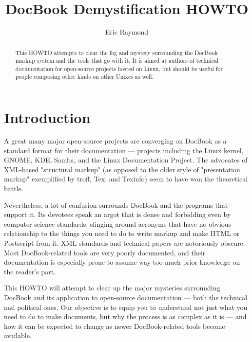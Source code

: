 \documentclass[pdftex,english,a4paper,10pt]{infocom}
\title{DocBook Demystification HOWTO}
\author{Eric Raymond}
\begin{document}
\maketitle

\begin{abstract}


  This HOWTO attempts to clear the fog and mystery surrounding the
  DocBook markup system and the tools that go with it.  It is aimed at
  authors of technical documentation for open-source projects hosted
  on Linux, but should be useful for people composing other kinds on
  other Unixes as well.  
  
\end{abstract}


\section{Introduction}
\label{intro}\hypertarget{intro}{}%

A great many major open-source projects are converging on
DocBook as a standard format for their documentation --- projects
including the Linux kernel, GNOME, KDE, Samba, and the Linux
Documentation Project.  The advocates of XML-based "structural markup"
(as opposed to the older style of "presentation markup" exemplified by
troff, Tex, and Texinfo) seem to have won the theoretical
battle.

Nevertheless, a lot of confusion surrounds DocBook and the
programs that support it.  Its devotees speak an argot that is dense
and forbidding even by computer-science standards, slinging around
acronyms that have no obvious relationship to the things you need to
do to write markup and make HTML or Postscript from it.  XML standards
and technical papers are notoriously obscure.  Most DocBook-related
tools are very poorly documented, and their documentation is
especially prone to assume way too much prior knowledge on the
reader's part.

This HOWTO will attempt to clear up the major mysteries
surrounding DocBook and its application to open-source documentation
--- both the technical and political ones.  Our objective is to equip
you to understand not just what you need to do to make documents, but
why the process is as complex as it is --- and how it can be
expected to change as newer DocBook-related tools become
available.
\end{document}
